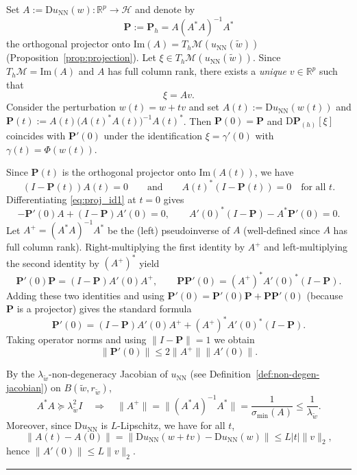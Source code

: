 \documentclass[twoside,11pt]{article}
\newcommand{\BlackBoxProof}{\rule{1.5ex}{1.5ex}}
\renewenvironment{proof}{\par\noindent{\bf Proof\ }}{\hfill\BlackBoxProof\par\medskip}
\newcommand{\R}{\mathbb{R}}
\renewcommand{\P}{\mathbf{P}}
\newcommand{\D}{\mathrm{D}}
\newcommand{\NN}{\mathrm{NN}}
\begin{document}
\begin{proof}
Set $A:=\D u_\NN(w):\R^p\to\mathcal H$ and denote by
\[
\P := \P_h = A(A^*A)^{-1}A^*
\]
the orthogonal projector onto $\mathrm{Im}(A)=T_h\mathcal M(u_\NN(\tilde w))$ (Proposition~\ref{prop:projection}).
Let $\xi\in T_h\mathcal M(u_\NN(\tilde w))$. Since $T_h\mathcal M=\mathrm{Im}(A)$ and $A$ has full
column rank, there exists a \emph{unique} $v\in\R^p$ such that
\begin{equation}\label{eq:xi_rep}
\xi=A v.
\end{equation}
Consider the perturbation $w(t)=w+t v$ and set $A(t):=\D u_\NN(w(t))$ and
$\P(t):=A(t)\big(A(t)^*A(t)\big)^{-1}A(t)^*$.
Then $\P(0)=\P$ and $\D \P_{(h)}[\xi]$ coincides with $\P'(0)$ under the identification
$\xi=\gamma'(0)$ with $\gamma(t)=\Phi(w(t))$.

Since $\P(t)$ is the orthogonal projector onto $\mathrm{Im}(A(t))$, we have
\begin{equation}\label{eq:proj_id1}
(I-\P(t))A(t)=0
\qquad\text{and}\qquad
A(t)^*(I-\P(t))=0
\quad\text{for all }t.
\end{equation}
Differentiating \eqref{eq:proj_id1} at $t=0$ gives
\[
-\P'(0)A + (I-\P)A'(0)=0,
\qquad
A'(0)^*(I-\P) - A^*\P'(0)=0.
\]
Let $A^+=(A^*A)^{-1}A^*$ be the (left) pseudoinverse of $A$ (well-defined since $A$ has full
column rank). Right-multiplying the first identity by $A^+$ and left-multiplying the second
identity by $(A^+)^*$ yield
\[
\P'(0)\P = (I-\P)A'(0)A^+,
\qquad
\P \P'(0) = (A^+)^*A'(0)^*(I-\P).
\]
Adding these two identities and using $\P'(0)=\P'(0)\P + \P \P'(0)$ (because $\P$ is a projector)
gives the standard formula
\begin{equation*}
\P'(0) = (I-\P) A'(0) A^+ + (A^+)^* A'(0)^* (I-\P).
\end{equation*}
Taking operator norms and using $\|I-\P\|=1$ we obtain
\begin{equation}\label{eq:dP_basic_bound}
\|\P'(0)\|
\le 2 \|A^+\| \|A'(0)\|.
\end{equation}

By the $\lambda_{\tilde w}$-non-degeneracy Jacobian of $u_\NN$  (see Definition~\ref{def:non-degen-jacobian}) on $B(\tilde w,r_{\tilde w})$,
\[
A^*A \succeq \lambda_{\tilde w}^2 I
\quad\Longrightarrow\quad
\|A^+\|=\|(A^*A)^{-1}A^*\|=\frac{1}{\sigma_{\min}(A)}\le \frac{1}{\lambda_{\tilde w}}.
\]
Moreover, since $\D u_\NN$ is $L$-Lipschitz, we have for all $t$,
\[
\|A(t)-A(0)\| = \|\D u_\NN(w+tv)-\D u_\NN(w)\| \le L|t| \|v\|_2,
\]
hence $\|A'(0)\|\le L\|v\|_2$.


\end{proof}
\end{document}
